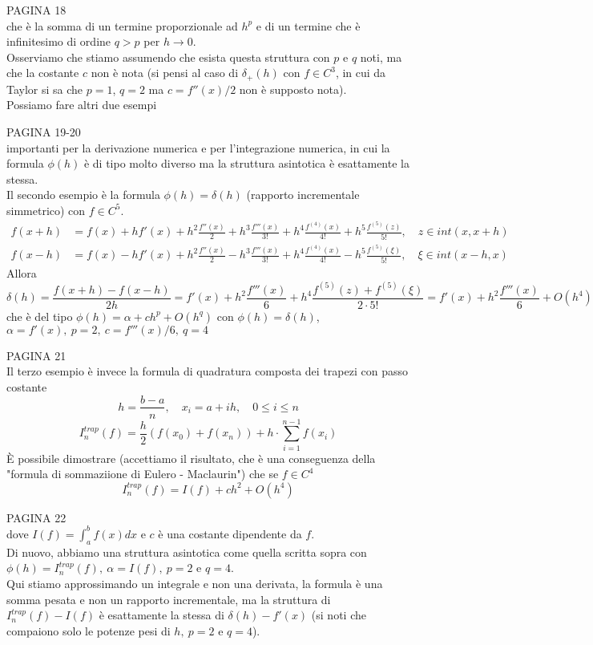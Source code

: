 \documentclass[12pt,a4paper]{article}
\begin{document}
PAGINA 18 \\ %
che è la somma di un termine proporzionale ad $h^p$ e di un termine che è infinitesimo di ordine $q>p$ per $h \to 0$.\\
Osserviamo che stiamo assumendo che esista questa struttura con $p$ e $q$ noti, ma che la costante $c$ non è nota (si pensi al caso di $\delta_+ (h)$ con $f \in C^3$, in cui da Taylor si sa che $p=1$, $q=2$ ma $c = f''(x)/2$ non è supposto nota).\\
Possiamo fare altri due esempi

PAGINA 19-20 \\ %
importanti per la derivazione numerica e per l'integrazione numerica, in cui la formula $\phi (h)$ è di tipo molto diverso ma la struttura asintotica è esattamente la stessa.\\
Il secondo esempio è la formula $\phi (h) = \delta (h)$ (rapporto incrementale simmetrico) con $f \in C^5$.\\
\[
\begin{split}
f(x+h) & = f(x) + hf'(x) + h^2 \frac{f''(x)}{2} + h^3 \frac{f'''(x)}{3!} + h^4 \frac{f^{(4)}(x)}{4!} + h^5 \frac{f^{(5)} (z)}{5!}, \quad z \in int(x, x+h) \\
f(x-h) & = f(x) - hf'(x) + h^2 \frac{f''(x)}{2} - h^3 \frac{f'''(x)}{3!} + h^4 \frac{f^{(4)} (x)}{4!} - h^5 \frac{f^{(5)} (\xi)}{5!}, \quad \xi \in int(x-h, x)
\end{split}
\]
Allora
\[
\delta (h) = \frac{f(x+h) - f(x-h)}{2h} = f'(x) + h^2 \frac{f'''(x)}{6} + h^4 \frac{f^{(5)} (z) + f^{(5)} (\xi)}{2 \cdot 5!} = f'(x) + h^2 \frac{f'''(x)}{6} + O(h^4)
\]
che è del tipo $\phi (h) = \alpha + ch^p + O(h^q)$ con $\phi (h) = \delta (h)$, $\alpha = f'(x), \  p=2, \ c=f'''(x)/6, \ q=4$

PAGINA 21 \\ %
Il terzo esempio è invece la formula di quadratura composta dei trapezi con passo costante
\[
h = \frac{b-a}{n}, \quad x_i = a + ih, \quad 0 \le i \le n
\]
\[
I_n^{trap} (f) = \frac{h}{2} (f(x_0) + f(x_n)) + h \cdot \sum_{i=1}^{n-1} f(x_i)
\]
È possibile dimostrare (accettiamo il risultato, che è una conseguenza della "formula di sommaziione di Eulero - Maclaurin") che se $f \in C^4$
\[
I_n^{trap} (f) = I(f) + ch^2 + O(h^4)
\]

PAGINA 22 \\ %
dove $I(f) = \int_a^b f(x) dx$ e $c$ è una costante dipendente da $f$.\\
Di nuovo, abbiamo una struttura asintotica come quella scritta sopra con $\phi (h) = I_n^{trap} (f), \ \alpha = I(f), \ p=2$ e $q=4$.\\
Qui stiamo approssimando un integrale e non una derivata, la formula è una somma pesata e non un rapporto incrementale, ma la struttura di $I_n^{trap} (f) - I(f)$ è esattamente la stessa di $\delta (h) - f'(x)$ (si noti che compaiono solo le potenze pesi di $h, \ p=2$ e $q=4$).
\end{document}
